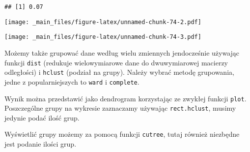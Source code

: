 \documentclass[
]{book}
\newenvironment{Shaded}{\begin{snugshade}}{\end{snugshade}}
\newcommand{\AttributeTok}[1]{\textcolor[rgb]{0.77,0.63,0.00}{#1}}
\newcommand{\CommentTok}[1]{\textcolor[rgb]{0.56,0.35,0.01}{\textit{#1}}}
\newcommand{\DecValTok}[1]{\textcolor[rgb]{0.00,0.00,0.81}{#1}}
\newcommand{\FunctionTok}[1]{\textcolor[rgb]{0.00,0.00,0.00}{#1}}
\newcommand{\NormalTok}[1]{#1}
\newcommand{\OtherTok}[1]{\textcolor[rgb]{0.56,0.35,0.01}{#1}}
\newcommand{\SpecialCharTok}[1]{\textcolor[rgb]{0.00,0.00,0.00}{#1}}
\begin{document}
\begin{verbatim}
## [1] 0.07
\end{verbatim}

\begin{Shaded}
\end{Shaded}

\texttt{[image: \_main\_files/figure-latex/unnamed-chunk-74-2.pdf]}

\begin{Shaded}
\end{Shaded}

\texttt{[image: \_main\_files/figure-latex/unnamed-chunk-74-3.pdf]}

Możemy także grupować dane według wielu zmiennych jendocześnie używając funkcji \texttt{dist} (redukuje wielowymiarowe dane do dwuwymiarowej macierzy odległości) i \texttt{hclust} (podział na grupy). Należy wybrać metodę grupowania, jedne z popularniejszych to \texttt{ward} i \texttt{complete}.

Wynik można przedstawić jako dendrogram korzystając ze zwykłej funkcji \texttt{plot}. Poszczególne grupy na wykresie zaznaczamy używając \texttt{rect.hclust}, musimy jedynie podać ilość grup.

Wyświetlić grupy możemy za pomocą funkcji \texttt{cutree}, tutaj również niezbędne jest podanie ilości grup.
\end{document}
